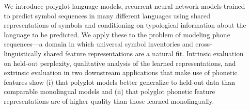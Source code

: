 We introduce polyglot language models, recurrent neural network models trained to predict symbol sequences in many different languages using shared representations of symbols and conditioning on typological information about the language to be predicted. We apply these to the problem of modeling phone sequences—a domain in which universal symbol inventories and cross-linguistically shared feature representations are a natural fit. Intrinsic evaluation on held-out perplexity, qualitative analysis of the learned representations, and extrinsic evaluation in two downstream applications that make use of phonetic features show (i) that polyglot models better generalize to held-out data than comparable monolingual models and (ii) that polyglot phonetic feature representations are of higher quality than those learned monolingually.
